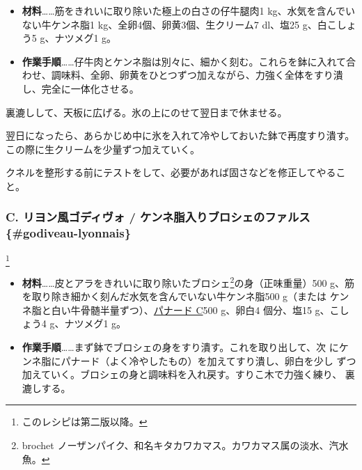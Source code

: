 \begin{recette}
\begin{itemize}
\item
  \textbf{材料}\ldots{}\ldots{}筋をきれいに取り除いた極上の白さの仔牛腿肉1
  kg、水気を含んでいない牛ケンネ脂1 kg、全卵4個、卵黄3個、生クリーム7
  dl、塩25 g、白こしょう5 g、ナツメグ1 g。
\item
  \textbf{作業手順}\ldots{}\ldots{}仔牛肉とケンネ脂は別々に、細かく刻む。これらを鉢に入れて合わせ、調味料、全卵、卵黄をひとつずつ加えながら、力強く全体をすり潰し、完全に一体化させる。
\end{itemize}

裏漉しして、天板に広げる。氷の上にのせて翌日まで休ませる。

翌日になったら、あらかじめ中に氷を入れて冷やしておいた鉢で再度すり潰す。この際に生クリームを少量ずつ加えていく。

クネルを整形する前にテストをして、必要があれば固さなどを修正してやること。

\maeaki

\hypertarget{godiveau-c}{%
\subsubsection{C. リヨン風ゴディヴォ / ケンネ脂入りブロシェのファルス
\{\#godiveau-lyonnais\}}\label{godiveau-c}}

\footnote{このレシピは第二版以降。}


\begin{itemize}
\item
  \textbf{材料}\ldots{}\ldots{}皮とアラをきれいに取り除いたブロシェ\footnote{brochet
    ノーザンパイク、和名キタカワカマス。カワカマス属の淡水、汽水魚。}の身（正味重量）500
  g、筋を取り除き細かく刻んだ水気を含んでいない牛ケンネ脂500 g（または
  ケンネ脂と白い牛骨髄半量ずつ）、\protect\hyperlink{panade-c}{パナード
  C}500 g、卵白4 個分、塩15 g、こしょう4 g、ナツメグ1 g。
\item
  \textbf{作業手順}\ldots{}\ldots{}まず鉢でブロシェの身をすり潰す。これを取り出して、次
  にケンネ脂にパナード（よく冷やしたもの）を加えてすり潰し、卵白を少し
  ずつ加えていく。ブロシェの身と調味料を入れ戻す。すりこ木で力強く練り、
  裏漉しする。
\end{itemize}


\end{recette}
